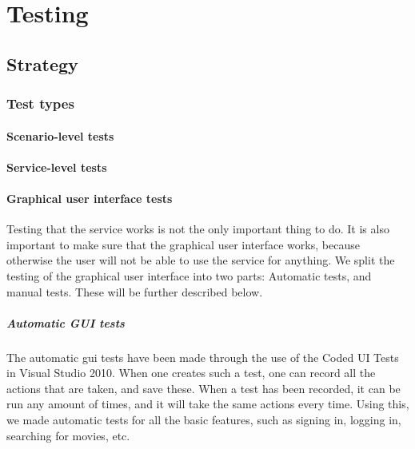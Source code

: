 \chapter{Testing}
\label{Testing}

\section{Strategy}
\label{Testing_Strategy}

\subsection{Test types}
\label{Testing_Strategy_Types}

\subsubsection{Scenario-level tests}
\label{Testing_Strategy_Types_Scenario}

\subsubsection{Service-level tests}
\label{Testing_Strategy_Types_Service}

\subsubsection{Graphical user interface tests}
\label{Testing_Strategy_Types_EndUser}
Testing that the service works is not the only important thing to do. It is also important to make sure that the graphical user interface works, because otherwise the user will not be able to use the service for anything. We split the testing of the graphical user interface into two parts: Automatic tests, and manual tests. These will be further described below.

\paragraph{Automatic GUI tests}
The automatic gui tests have been made through the use of the Coded UI Tests in Visual Studio 2010. When one creates such a test, one can record all the actions that are taken, and save these. When a test has been recorded, it can be run any amount of times, and it will take the same actions every time. Using this, we made automatic tests for all the basic features, such as signing in, logging in, searching for movies, etc.

